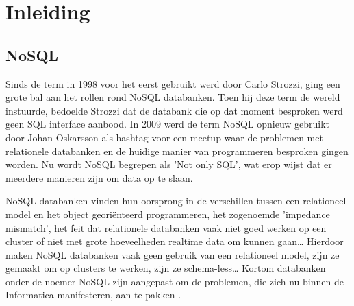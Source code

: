 \chapter{Inleiding}
\label{ch:inleiding}



\section{NoSQL}
Sinds de term in 1998 voor het eerst gebruikt werd door Carlo Strozzi, ging een grote bal aan het rollen rond NoSQL databanken.
Toen hij deze term de wereld instuurde, bedoelde Strozzi dat de databank die op dat moment besproken werd geen SQL interface aanbood.
In 2009 werd de term NoSQL opnieuw gebruikt door Johan Oskarsson als hashtag voor een meetup waar de problemen met relationele databanken en de huidige manier van programmeren besproken gingen worden.
Nu wordt NoSQL begrepen als 'Not only SQL', wat erop wijst dat er meerdere manieren zijn om data op te slaan. \citep{Fowler2013Introduction}

NoSQL databanken vinden hun oorsprong in de verschillen tussen een relationeel model en het object georiënteerd programmeren, het zogenoemde 'impedance mismatch', het feit dat relationele databanken vaak niet goed werken op een cluster of niet met grote hoeveelheden realtime data om kunnen gaan\dots
Hierdoor maken NoSQL databanken vaak geen gebruik van een relationeel model, zijn ze gemaakt om op clusters te werken, zijn ze schema-less\dots
Kortom databanken onder de noemer NoSQL zijn aangepast om de problemen, die zich nu binnen de Informatica manifesteren, aan te pakken \citep{Fowler2012NoSQLDef}.

